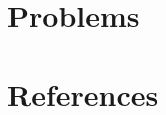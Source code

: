 \documentclass[11pt]{article}
\begin{document}
\section{Problems}
\label{sec:orga570c03}


\section{References}
\label{sec:org28b8c3e}
\label{bibliographystyle link}


\label{bibliography link}

\end{document}
